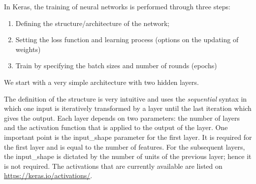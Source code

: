 \documentclass[]{krantz}
\makeatletter
\newenvironment{Shaded}{\begin{snugshade}}{\end{snugshade}}
\newcommand{\CommentTok}[1]{\textcolor[rgb]{0.37,0.37,0.37}{\textit{#1}}}
\newcommand{\DataTypeTok}[1]{\textcolor[rgb]{0.27,0.27,0.27}{#1}}
\newcommand{\DecValTok}[1]{\textcolor[rgb]{0.06,0.06,0.06}{#1}}
\newcommand{\KeywordTok}[1]{\textcolor[rgb]{0.27,0.27,0.27}{\textbf{#1}}}
\newcommand{\NormalTok}[1]{#1}
\newcommand{\OperatorTok}[1]{\textcolor[rgb]{0.43,0.43,0.43}{\textbf{#1}}}
\newcommand{\StringTok}[1]{\textcolor[rgb]{0.5,0.5,0.5}{#1}}
\providecommand{\tightlist}{%
  \setlength{\itemsep}{0pt}\setlength{\parskip}{0pt}}
\newenvironment{kframe}{%
\medskip{}
\setlength{\fboxsep}{.8em}
 \def\at@end@of@kframe{}%
 \ifinner\ifhmode%
  \def\at@end@of@kframe{\end{minipage}}%
  \begin{minipage}{\columnwidth}%
 \fi\fi%
 \def\FrameCommand##1{\hskip\@totalleftmargin \hskip-\fboxsep
 \colorbox{shadecolor}{##1}\hskip-\fboxsep
     \hskip-\linewidth \hskip-\@totalleftmargin \hskip\columnwidth}%
 \MakeFramed {\advance\hsize-\width
   \@totalleftmargin\z@ \linewidth\hsize
   \@setminipage}}%
 {\par\unskip\endMakeFramed%
 \at@end@of@kframe}
\renewenvironment{Shaded}{\begin{kframe}}{\end{kframe}}
\theoremstyle{definition}
\theoremstyle{definition}
\theoremstyle{definition}
\theoremstyle{remark}
\makeatother
\begin{document}
\normalsize

In Keras, the training of neural networks is performed through three
steps:

\begin{enumerate}
\def\labelenumi{\arabic{enumi}.}
\tightlist
\item
  Defining the structure/architecture of the network;\\
\item
  Setting the loss function and learning process (options on the
  updating of weights)
\item
  Train by specifying the batch sizes and number of rounds (epochs)
\end{enumerate}

We start with a very simple architecture with two hidden layers.

\footnotesize

\begin{Shaded}
\end{Shaded}

\normalsize

The definition of the structure is very intuitive and uses the
\emph{sequential} syntax in which one input is iteratively transformed
by a layer until the last iteration which gives the output. Each layer
depends on two parameters: the number of layers and the activation
function that is applied to the output of the layer. One important point
is the input\_shape parameter for the first layer. It is required for
the first layer and is equal to the number of features. For the
subsequent layers, the input\_shape is dictated by the number of units
of the previous layer; hence it is not required. The activations that
are currently available are listed on
\url{https://keras.io/activations/}.
\end{document}
